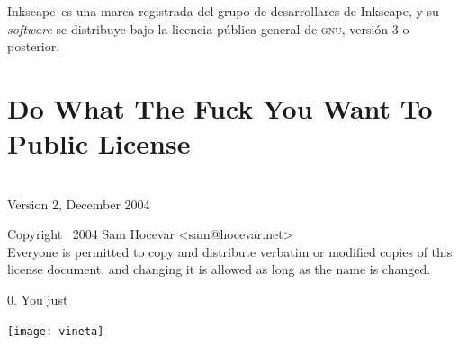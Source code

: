\documentclass[14pt,twoside,final]{extbook} %
\providecommand\phantomsection{} %
\begin{document}
Inkscape\texttrademark\ es una marca registrada del grupo de desarrollares de Inkscape, y su \emph{software} se distribuye bajo la licencia pública general de \textsc{gnu}, versión 3 o posterior.
\chapter{Do What The Fuck You Want To Public License}
\label{ap:wtfpl-license}
\begin{center}
 \\ Version 2, December 2004
\end{center}
Copyright \textcopyright\ 2004 Sam Hocevar <sam@hocevar.net> \\

\noindent Everyone is permitted to copy and distribute verbatim or modified copies of this license document, and changing it is allowed as long as the name is changed.
\begin{center}
\end{center}
0. You just 
\newpage
\thispagestyle{empty}
\pagestyle{fancy}
\fancyhf{} %
\fancyhead[RO,LE]{\thepage}
\renewcommand{\headrulewidth}{0pt}
\printindex[nombres]
\newpage
\thispagestyle{empty}
\pagestyle{fancy}
\fancyhf{} %
\fancyhead[RO,LE]{\thepage}
\renewcommand{\headrulewidth}{0pt}
\printindex[lugares]
\newpage
\pagestyle{empty}
\hspace*{0pt}
\vfill
\begin{center}
\texttt{[image: vineta]}\phantomsection\label{fig:vineta}
\end{center}
\end{document}
